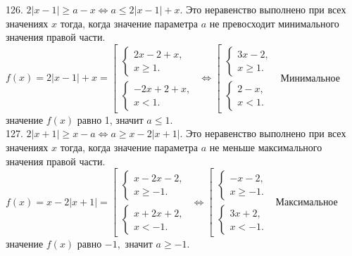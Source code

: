 126. $2|x-1|\geqslant a-x\Leftrightarrow a\leqslant  2|x-1|+x.$ Это неравенство выполнено при всех значениях $x$ тогда, когда значение параметра $a$ не превосходит минимального значения правой части. $f(x)=2|x-1|+x=\left[\begin{array}{l}\begin{cases}2x-2+x,\\ x\geqslant 1. \end{cases}\\ \begin{cases}-2x+2+x,\\ x< 1. \end{cases}\end{array}\right.\Leftrightarrow\left[\begin{array}{l}\begin{cases}3x-2,\\ x\geqslant 1. \end{cases}\\ \begin{cases}2-x,\\ x<1. \end{cases}\end{array}\right.$ Минимальное значение $f(x)$ равно 1, значит $a\leqslant1.$\\
127. $2|x+1|\geqslant x-a\Leftrightarrow a\geqslant  x-2|x+1|.$ Это неравенство выполнено при всех значениях $x$ тогда, когда значение параметра $a$ не меньше максимального значения правой части. $f(x)=x-2|x+1|=\left[\begin{array}{l}\begin{cases}x-2x-2,\\ x\geqslant -1. \end{cases}\\ \begin{cases}x+2x+2,\\ x< -1. \end{cases}\end{array}\right.\Leftrightarrow\left[\begin{array}{l}\begin{cases}-x-2,\\ x\geqslant -1. \end{cases}\\ \begin{cases}3x+2,\\ x<-1. \end{cases}\end{array}\right.$ Максимальное значение $f(x)$ равно $-1,$ значит $a\geqslant-1.$\\
